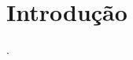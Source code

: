 \section{Introdução}

\lipsum[1] \cite{belcherSeekingAcceptanceEnglishonly2007, baumvolScholarlyPublicationBrazilian2021, flowerdewEnglishResearchPublication2012, cargillIntroductionSpecialIssue2008}.
